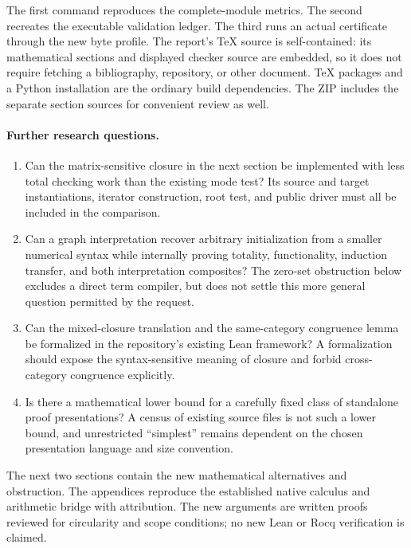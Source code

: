 \documentclass[11pt,letterpaper]{article}
\theoremstyle{definition}
\theoremstyle{remark}
\begin{document}
The first command reproduces the complete-module metrics. The second
recreates the executable validation ledger. The third runs an actual
certificate through the new byte profile. The report's TeX source is
self-contained: its mathematical sections and displayed checker source
are embedded, so it does not require fetching a bibliography, repository,
or other document. TeX packages and a Python installation are the ordinary
build dependencies. The ZIP includes the separate section sources for
convenient review as well.

\paragraph{Further research questions.}
\begin{enumerate}
\item Can the matrix-sensitive closure in the next section be implemented
with less total checking work than the existing mode test? Its source
and target instantiations, iterator construction, root test, and public
driver must all be included in the comparison.
\item Can a graph interpretation recover arbitrary initialization from
a smaller numerical syntax while internally proving totality,
functionality, induction transfer, and both interpretation composites?
The zero-set obstruction below excludes a direct term compiler, but
does not settle this more general question permitted by the request.
\item Can the mixed-closure translation and the same-category congruence
lemma be formalized in the repository's existing Lean framework? A
formalization should expose the syntax-sensitive meaning of closure
and forbid cross-category congruence explicitly.
\item Is there a mathematical lower bound for a carefully fixed class
of standalone proof presentations? A census of existing source files
is not such a lower bound, and unrestricted ``simplest'' remains
dependent on the chosen presentation language and size convention.
\end{enumerate}

The next two sections contain the new mathematical alternatives and
obstruction. The appendices reproduce the established native calculus
and arithmetic bridge with attribution. The new arguments are written
proofs reviewed for circularity and scope conditions; no new Lean or
Rocq verification is claimed.
\end{document}
